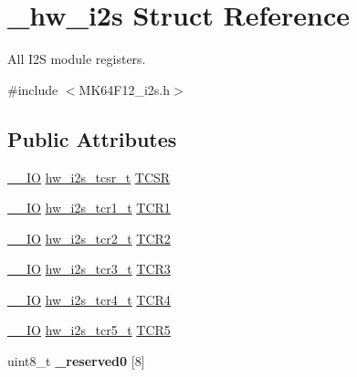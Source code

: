 \hypertarget{struct__hw__i2s}{}\section{\+\_\+hw\+\_\+i2s Struct Reference}
\label{struct__hw__i2s}


All I2S module registers.  




{\ttfamily \#include $<$M\+K64\+F12\+\_\+i2s.\+h$>$}

\subsection*{Public Attributes}
\begin{DoxyCompactItemize}
\item 
\hyperlink{core__sc300_8h_aec43007d9998a0a0e01faede4133d6be}{\+\_\+\+\_\+\+IO} \hyperlink{union__hw__i2s__tcsr}{hw\+\_\+i2s\+\_\+tcsr\+\_\+t} \hyperlink{struct__hw__i2s_ae5fbb438abfcde15c08c24c2b042f581}{T\+C\+SR}
\item 
\hyperlink{core__sc300_8h_aec43007d9998a0a0e01faede4133d6be}{\+\_\+\+\_\+\+IO} \hyperlink{union__hw__i2s__tcr1}{hw\+\_\+i2s\+\_\+tcr1\+\_\+t} \hyperlink{struct__hw__i2s_ab9b4557e97e7dfe8659c27221d63eb63}{T\+C\+R1}
\item 
\hyperlink{core__sc300_8h_aec43007d9998a0a0e01faede4133d6be}{\+\_\+\+\_\+\+IO} \hyperlink{union__hw__i2s__tcr2}{hw\+\_\+i2s\+\_\+tcr2\+\_\+t} \hyperlink{struct__hw__i2s_ae98677d9a4368245d7cdecff34f4349c}{T\+C\+R2}
\item 
\hyperlink{core__sc300_8h_aec43007d9998a0a0e01faede4133d6be}{\+\_\+\+\_\+\+IO} \hyperlink{union__hw__i2s__tcr3}{hw\+\_\+i2s\+\_\+tcr3\+\_\+t} \hyperlink{struct__hw__i2s_a7f168982d01160651251e409c1e3d604}{T\+C\+R3}
\item 
\hyperlink{core__sc300_8h_aec43007d9998a0a0e01faede4133d6be}{\+\_\+\+\_\+\+IO} \hyperlink{union__hw__i2s__tcr4}{hw\+\_\+i2s\+\_\+tcr4\+\_\+t} \hyperlink{struct__hw__i2s_a8adfe976671f876834d369bc67ea2a76}{T\+C\+R4}
\item 
\hyperlink{core__sc300_8h_aec43007d9998a0a0e01faede4133d6be}{\+\_\+\+\_\+\+IO} \hyperlink{union__hw__i2s__tcr5}{hw\+\_\+i2s\+\_\+tcr5\+\_\+t} \hyperlink{struct__hw__i2s_aeb5da5c10cc6ca6d2d0aae65f1a462d6}{T\+C\+R5}
\item 
uint8\+\_\+t {\bfseries \+\_\+reserved0} \mbox{[}8\mbox{]}\hypertarget{struct__hw__i2s_aee5dfb3a0e9c36fbed5655c2aa71f405}{}\label{struct__hw__i2s_aee5dfb3a0e9c36fbed5655c2aa71f405}


\end{DoxyCompactItemize}
